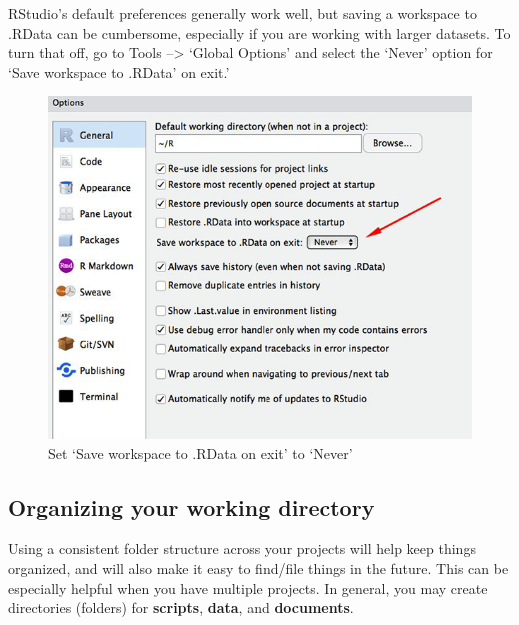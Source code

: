 \documentclass[]{book}
\begin{document}
RStudio's default preferences generally work well, but saving a
workspace to .RData can be cumbersome, especially if you are working
with larger datasets. To turn that off, go to Tools --\textgreater{}
`Global Options' and select the `Never' option for `Save workspace to
.RData' on exit.'

\begin{figure}
\centering
\includegraphics{img/rstudio-preferences.png}
\caption{Set `Save workspace to .RData on exit' to `Never'}
\end{figure}

\subsection{Organizing your working
directory}\label{organizing-your-working-directory}

Using a consistent folder structure across your projects will help keep
things organized, and will also make it easy to find/file things in the
future. This can be especially helpful when you have multiple projects.
In general, you may create directories (folders) for \textbf{scripts},
\textbf{data}, and \textbf{documents}.
\end{document}
